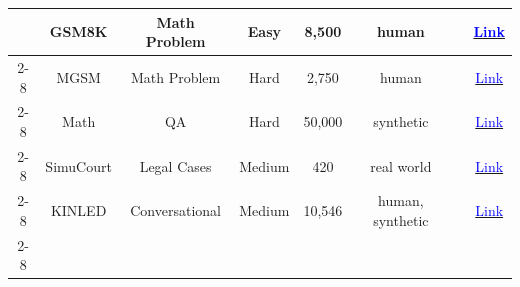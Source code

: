 \begin{table}[!htp]
{\begin{tabular}{c|c|c|c|c|c|c|c}
                                                                                  & GSM8K                  & Math Problem            & Easy                & 8,500            & human               & \cite{du2023improving,yue2024mathvc}                                                                                          & \href{https://huggingface.co/datasets/openai/gsm8k}{\textcolor{blue}{Link}}                                                                                       \\ \cline{2-8}
                                                                                  & MGSM                   & Math Problem            & Hard                & 2,750            & human               & \cite{chen2023agentverse}                                                                                                                                                       & \href{https://github.com/google-research/url-nlp}{\textcolor{blue}{Link}}                                                                                         \\ \cline{2-8}
                                                                                  & Math                   & QA                      & Hard                & 50,000           & synthetic           & \cite{li2023camel,zhang2023exploring}                                                                                         & \href{https://huggingface.co/camel-ai}{\textcolor{blue}{Link}}                                                                                                    \\ \cline{2-8}
                                                                                  & SimuCourt              & Legal Cases             & Medium              & 420              & real world          & \cite{he2024simucourt}                                                                                                                                                          & \href{https://github.com/Zhitao-He/SimuCourt?utm_source=catalyzex.com}{\textcolor{blue}{Link}}                                                                    \\ \cline{2-8}
                                                                                  & KINLED                 & Conversational          & Medium              & 10,546           & human, synthetic    & \cite{sun2024lawluo}                                                                                                                                                            & \href{https://github.com/nefujing/lawluo}{\textcolor{blue}{Link}}                                                                                                 \\ \cline{2-8}

\end{tabular}}
\end{table}
